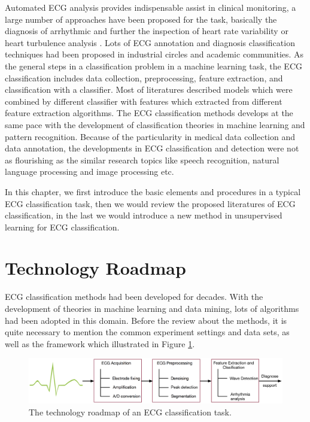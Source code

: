 \documentclass[graybox]{svmult}
\begin{document}
Automated ECG analysis provides indispensable assist in clinical monitoring, a large number of approaches have been proposed for the task, basically the diagnosis of arrhythmic and further the inspection of heart rate variability or heart turbulence analysis \cite{mar2011optimization}. 
Lots of  ECG annotation and diagnosis classification techniques had been proposed in industrial circles and academic communities. 
As the general steps in a classification problem in a machine learning task, the ECG classification includes data collection, preprocessing, feature extraction, and classification with a classifier. 
Most of literatures described models which were combined by different classifier with features which extracted from different feature extraction algorithms.
The ECG classification methods develops at the same pace with the development of classification theories in machine learning and pattern recognition. 
Because of the particularity in medical data collection and data annotation, the developments in ECG classification and detection were not as flourishing as the similar research topics like speech recognition, natural language processing and image processing etc.

In this chapter, we first introduce the basic elements and procedures in a typical ECG classification task, then we would review the proposed literatures of ECG classification, in the last we would introduce a new method in unsupervised learning for ECG classification. 


\section{Technology Roadmap}
ECG classification methods had been developed for decades. With the development of theories in machine learning and data mining, lots of algorithms had been adopted in this domain. Before the review about the methods, it is quite necessary to mention the common experiment settings and data sets, as well as the framework which illustrated in Figure \ref{fig:1}.


%
\begin{figure}[]
\sidecaption
\includegraphics[scale=.32]{classification}
%
%
\caption{The technology roadmap of an ECG classification task.}
\label{fig:1}       %
\end{figure}
\end{document}
